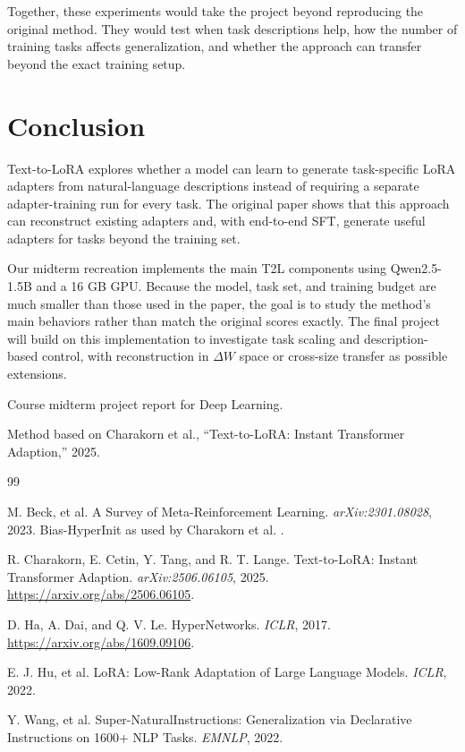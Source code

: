 \documentclass{article}
\begin{document}
Together, these experiments would take the project beyond reproducing the original method. They would test when task descriptions help, how the number of training tasks affects generalization, and whether the approach can transfer beyond the exact training setup.

\section{Conclusion}

Text-to-LoRA explores whether a model can learn to generate task-specific LoRA adapters from natural-language descriptions instead of requiring a separate adapter-training run for every task. The original paper shows that this approach can reconstruct existing adapters and, with end-to-end SFT, generate useful adapters for tasks beyond the training set.

Our midterm recreation implements the main T2L components using Qwen2.5-1.5B and a 16 GB GPU. Because the model, task set, and training budget are much smaller than those used in the paper, the goal is to study the method's main behaviors rather than match the original scores exactly. The final project will build on this implementation to investigate task scaling and description-based control, with reconstruction in $\Delta W$ space or cross-size transfer as possible extensions.

\begin{ack}
Course midterm project report for Deep Learning.

Method based on Charakorn et al., ``Text-to-LoRA: Instant Transformer Adaption,'' 2025.
\end{ack}

{\small

\begin{thebibliography}{99}

M. Beck, et al.
\newblock A Survey of Meta-Reinforcement Learning.
\newblock \emph{arXiv:2301.08028}, 2023.
\newblock Bias-HyperInit as used by Charakorn et al. \cite{charakorn2025texttolora}.

R. Charakorn, E. Cetin, Y. Tang, and R. T. Lange.
\newblock Text-to-LoRA: Instant Transformer Adaption.
\newblock \emph{arXiv:2506.06105}, 2025.
\newblock \url{https://arxiv.org/abs/2506.06105}.

D. Ha, A. Dai, and Q. V. Le.
\newblock HyperNetworks.
\newblock \emph{ICLR}, 2017.
\newblock \url{https://arxiv.org/abs/1609.09106}.

E. J. Hu, et al.
\newblock LoRA: Low-Rank Adaptation of Large Language Models.
\newblock \emph{ICLR}, 2022.

Y. Wang, et al.
\newblock Super-NaturalInstructions: Generalization via Declarative Instructions on 1600+ NLP Tasks.
\newblock \emph{EMNLP}, 2022.

\end{thebibliography}
}
\end{document}
